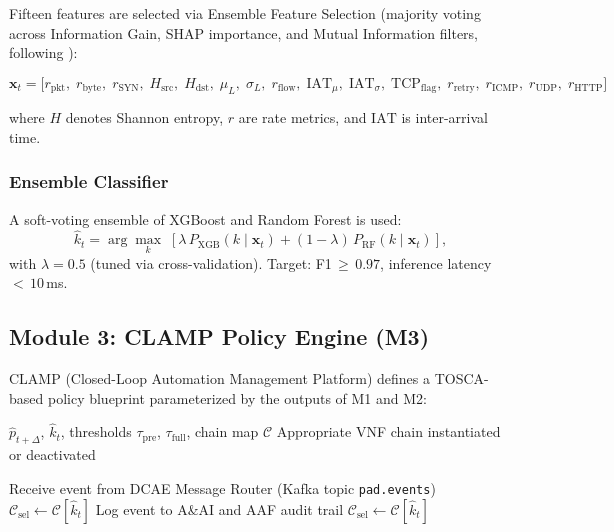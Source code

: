 \documentclass[12pt, a4paper]{article}
\begin{document}
Fifteen features are selected via Ensemble Feature Selection (majority voting
across Information Gain, SHAP importance, and Mutual Information filters,
following \cite{saha2022}):

\[
\mathbf{x}_t = \bigl[
  r_{\mathrm{pkt}},\; r_{\mathrm{byte}},\; r_{\mathrm{SYN}},\;
  H_{\mathrm{src}},\; H_{\mathrm{dst}},\; \mu_L,\; \sigma_L,\;
  r_{\mathrm{flow}},\; \mathrm{IAT}_{\mu},\; \mathrm{IAT}_{\sigma},\;
  \mathrm{TCP}_{\mathrm{flag}},\; r_{\mathrm{retry}},\;
  r_{\mathrm{ICMP}},\; r_{\mathrm{UDP}},\; r_{\mathrm{HTTP}}
\bigr]
\]

\noindent where $H$ denotes Shannon entropy, $r$ are rate metrics,
and $\mathrm{IAT}$ is inter-arrival time.

\subsubsection{Ensemble Classifier}

A soft-voting ensemble of XGBoost and Random Forest is used:
\begin{equation}
  \hat{k}_t = \arg\max_{k}\;\left[
    \lambda\, P_{\mathrm{XGB}}(k \mid \mathbf{x}_t) +
    (1-\lambda)\, P_{\mathrm{RF}}(k \mid \mathbf{x}_t)
  \right],
  \label{eq:ensemble}
\end{equation}
with $\lambda = 0.5$ (tuned via cross-validation). Target: F1\,$\geq\,0.97$,
inference latency\,$<\,10$\,ms.

\subsection{Module 3: CLAMP Policy Engine (M3)}

CLAMP (Closed-Loop Automation Management Platform) defines a TOSCA-based
policy blueprint parameterized by the outputs of M1 and M2:

\begin{algorithm}[H]
\caption{PAD-ONAP CLAMP Policy Execution}
\label{alg:clamp}
\begin{algorithmic}[1]
\Require $\hat{p}_{t+\Delta}$, $\hat{k}_t$, thresholds $\tau_{\mathrm{pre}}$,
         $\tau_{\mathrm{full}}$, chain map $\mathcal{C}$
\Ensure  Appropriate VNF chain instantiated or deactivated

\State Receive event from DCAE Message Router (Kafka topic \texttt{pad.events})
  \State $\mathcal{C}_{\mathrm{sel}} \gets \mathcal{C}[\hat{k}_t]$ 
  \State {}
  \State Log event to A\&AI and AAF audit trail
  \State $\mathcal{C}_{\mathrm{sel}} \gets \mathcal{C}[\hat{k}_t]$
  \State {}
\Else
    \State {}
  \EndIf
\EndIf
\end{algorithmic}
\end{algorithm}
\end{document}
